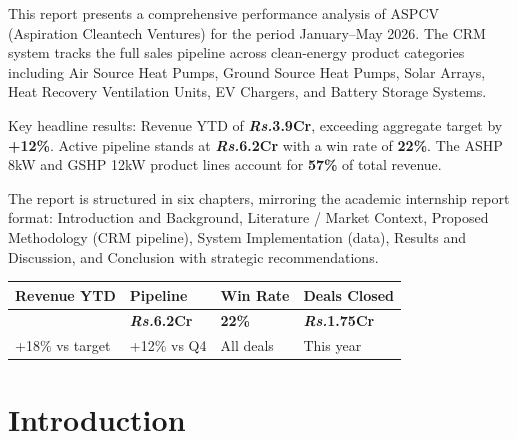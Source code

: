 \documentclass[12pt,a4paper]{report}
\newcommand{\rupee}{\textit{\textsf{\small Rs.}}}
\begin{document}
\begin{mdframed}[linecolor=aspcvaccent, linewidth=2pt, leftmargin=0, rightmargin=0, innerleftmargin=12pt, innerrightmargin=12pt, innertopmargin=12pt, innerbottommargin=12pt]
This report presents a comprehensive performance analysis of ASPCV (Aspiration Cleantech Ventures) for the period January--May 2026. The CRM system tracks the full sales pipeline across clean-energy product categories including Air Source Heat Pumps, Ground Source Heat Pumps, Solar Arrays, Heat Recovery Ventilation Units, EV Chargers, and Battery Storage Systems.

Key headline results: Revenue YTD of \textbf{\rupee{}3.9Cr}, exceeding aggregate target by \textbf{+12\%}. Active pipeline stands at \textbf{\rupee{}6.2Cr} with a win rate of \textbf{22\%}. The ASHP 8kW and GSHP 12kW product lines account for \textbf{57\%} of total revenue.

The report is structured in six chapters, mirroring the academic internship report format: Introduction and Background, Literature / Market Context, Proposed Methodology (CRM pipeline), System Implementation (data), Results and Discussion, and Conclusion with strategic recommendations.
\end{mdframed}

\vspace{10mm}
\begin{center}
\begin{tabular}{|C{3.5cm}|C{3.5cm}|C{3.5cm}|C{3.5cm}|}
\hline
{}\color{white}\textbf{Revenue YTD} & \color{white}\textbf{Pipeline} & \color{white}\textbf{Win Rate} & \color{white}\textbf{Deals Closed} \\
\hline
\rowcolor{rowgray}{\large\bfseries\color{aspcvgreen}\rupee{}3.9Cr} & {\large\bfseries\color{aspcvaccent}\rupee{}6.2Cr} & {\large\bfseries\color{aspcvorange}22\%} & {\large\bfseries\color{aspcvpurple}\rupee{}1.75Cr} \\
\hline
\small +18\% vs target & \small +12\% vs Q4 & \small All deals & \small This year \\
\hline
\end{tabular}
\end{center}

\tableofcontents
\clearpage

\chapter{Introduction}
\end{document}
